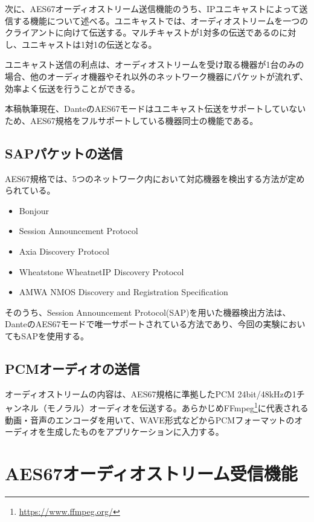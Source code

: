 次に、AES67オーディオストリーム送信機能のうち、IPユニキャストによって送信する機能について述べる。ユニキャストでは、オーディオストリームを一つのクライアントに向けて伝送する。マルチキャストが1対多の伝送であるのに対し、ユニキャストは1対1の伝送となる。

ユニキャスト送信の利点は、オーディオストリームを受け取る機器が1台のみの場合、他のオーディオ機器やそれ以外のネットワーク機器にパケットが流れず、効率よく伝送を行うことができる。

本稿執筆現在、DanteのAES67モードはユニキャスト伝送をサポートしていないため、AES67規格をフルサポートしている機器同士の機能である。

\subsection{SAPパケットの送信}

AES67規格では、5つのネットワーク内において対応機器を検出する方法が定められている。

\begin{itemize}
  \item {Bonjour}
  \item {Session Announcement Protocol}
  \item {Axia Discovery Protocol}
  \item {Wheatstone WheatnetIP Discovery Protocol}
  \item {AMWA NMOS Discovery and Registration Specification}
\end{itemize}

そのうち、Session Announcement Protocol(SAP)を用いた機器検出方法は、DanteのAES67モードで唯一サポートされている方法であり、今回の実験においてもSAPを使用する。

\subsection{PCMオーディオの送信}

オーディオストリームの内容は、AES67規格に準拠したPCM 24bit/48kHzの1チャンネル（モノラル）オーディオを伝送する。あらかじめFFmpeg\footnote{\url{https://www.ffmpeg.org/}}に代表される動画・音声のエンコーダを用いて、WAVE形式などからPCMフォーマットのオーディオを生成したものをアプリケーションに入力する。

\section{AES67オーディオストリーム受信機能}

